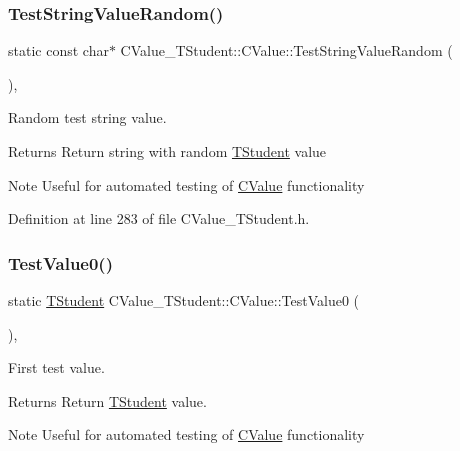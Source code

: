 \subsubsection{\texorpdfstring{Test\+String\+Value\+Random()}{TestStringValueRandom()}}
{\footnotesize\ttfamily static const char$\ast$ C\+Value\+\_\+\+T\+Student\+::\+C\+Value\+::\+Test\+String\+Value\+Random (\begin{DoxyParamCaption}{ }\end{DoxyParamCaption})\hspace{0.3cm}{\ttfamily [inline]}, {\ttfamily [static]}}



Random test string value. 

\begin{DoxyReturn}{Returns}
Return string with random \hyperlink{struct_c_value___t_student_1_1_t_student}{T\+Student} value 
\end{DoxyReturn}
\begin{DoxyNote}{Note}
Useful for automated testing of \hyperlink{class_c_value___t_student_1_1_c_value}{C\+Value} functionality 
\end{DoxyNote}


Definition at line 283 of file C\+Value\+\_\+\+T\+Student.\+h.

\mbox{\label{class_c_value___t_student_1_1_c_value_a7e1c9e64ef5c8428df0fd56772d1240e}} 
\subsubsection{\texorpdfstring{Test\+Value0()}{TestValue0()}}
{\footnotesize\ttfamily static \hyperlink{struct_c_value___t_student_1_1_t_student}{T\+Student} C\+Value\+\_\+\+T\+Student\+::\+C\+Value\+::\+Test\+Value0 (\begin{DoxyParamCaption}{ }\end{DoxyParamCaption})\hspace{0.3cm}{\ttfamily [inline]}, {\ttfamily [static]}}



First test value. 

\begin{DoxyReturn}{Returns}
Return \hyperlink{struct_c_value___t_student_1_1_t_student}{T\+Student} value. 
\end{DoxyReturn}
\begin{DoxyNote}{Note}
Useful for automated testing of \hyperlink{class_c_value___t_student_1_1_c_value}{C\+Value} functionality 
\end{DoxyNote}


